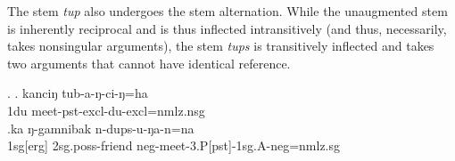 \begin{table}[htp]
\begin{center}
\caption{Stem augmentation and transitivity correspondences}\label{stem-aug}
\end{center}
\end{table}

The stem \emph{tup}  also undergoes the stem alternation. While the unaugmented stem is inherently reciprocal and is thus inflected intransitively (and thus, necessarily, takes nonsingular arguments), the stem \emph{tups} is transitively  inflected and takes two arguments that cannot have identical reference.

	 \ex. \ag. kanciŋ tub-a-ŋ-ci-ŋ=ha\\
 {\sc 1du} meet-{\sc pst-excl-du-excl=nmlz.nsg}\\
	 \bg.ka ŋ-gamnibak n-dups-u-ŋa-n=na\\
	 {\sc 1sg[erg]} {\sc 2sg.poss-}friend  {\sc neg-}meet{\sc -3.P[pst]-1sg.A-neg=nmlz.sg}\\









